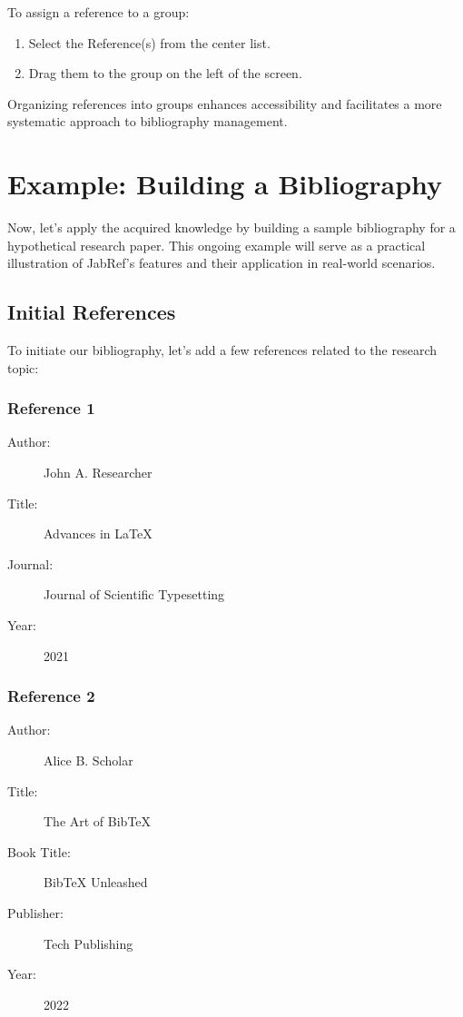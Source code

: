 			To assign a reference to a group:
			\begin{enumerate}
				\item Select the Reference(s) from the center list.
				\item Drag them to the group on the left of the screen.
			\end{enumerate}
			Organizing references into groups enhances accessibility and facilitates a more systematic approach to bibliography management.

	\section{Example: Building a Bibliography}
		Now, let's apply the acquired knowledge by building a sample bibliography for a hypothetical research paper. 
		This ongoing example will serve as a practical illustration of JabRef's features and their application in real-world scenarios.

		\subsection{Initial References}
			To initiate our bibliography, let's add a few references related to the research topic:

			\subsubsection{Reference 1}
				\begin{description}
					\item[Author:] John A. Researcher
					\item[Title:] Advances in LaTeX
					\item[Journal:] Journal of Scientific Typesetting
					\item[Year:] 2021
				\end{description}

			\subsubsection{Reference 2}
				\begin{description}
					\item[Author:] Alice B. Scholar
					\item[Title:] The Art of BibTeX
					\item[Book Title:] BibTeX Unleashed
					\item[Publisher:] Tech Publishing
					\item[Year:] 2022
				\end{description}

